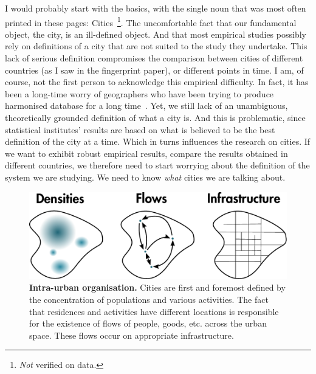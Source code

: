 I would probably start with the basics, with the single noun that was most often
printed in these pages: Cities~\footnote{\emph{Not} verified on data.}. The
uncomfortable fact that our fundamental object, the city, is an ill-defined
object. And that most empirical studies possibly rely on definitions of a city
that are not suited to the study they undertake.  This lack of serious
definition compromises the comparison between cities of different countries (as
I saw in the fingerprint paper), or different points in time. I am, of course,
not the first person to acknowledge this empirical difficulty. In fact, it has
been a long-time worry of geographers who have been trying to produce harmonised
database for a long time~\cite{Pumain:2015}. Yet, we still lack of an
unambiguous, theoretically grounded definition of what a city is. And this is
problematic, since statistical institutes' results are based on what is believed
to be the best definition of the city at a time. Which in turns influences the
research on cities. If we want to exhibit robust empirical results, compare the
results obtained in different countries, we therefore need to start worrying
about the definition of the system we are studying. We need to know \emph{what}
cities we are talking about.\\

\begin{figure}
    \centering
    \includegraphics[width=1\textwidth]{gfx/chapter-intro/intra-urban.pdf}
    \caption{{\bf Intra-urban organisation.} Cities are first and foremost defined by
    the concentration of populations and various activities. The fact that
residences and activities have different locations is responsible for the
existence of flows of people, goods, etc. across the urban space. These flows
occur on appropriate infrastructure.\label{fig:intra_urban}}
\end{figure}


